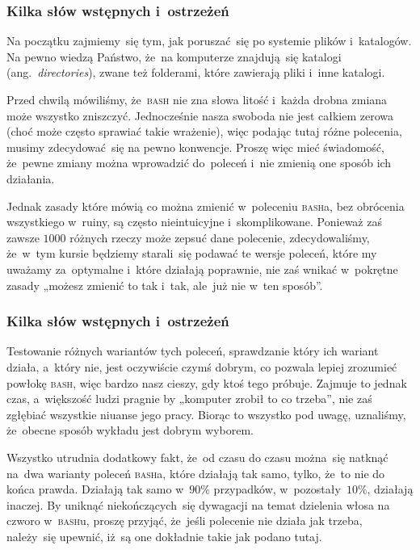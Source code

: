 \documentclass[10pt,t]{beamer}
\begin{document}
\begin{frame}
  \frametitle{Kilka słów wstępnych i~ostrzeżeń}


  Na początku zajmiemy~się tym, jak poruszać~się po systemie plików
  i~katalogów. Na pewno wiedzą Państwo, że~na komputerze znajdują~się
  katalogi (ang.~\textit{directories}), zwane też folderami, które zawierają
  pliki i~inne katalogi.

  Przed chwilą mówiliśmy, że~\textsc{bash} nie zna słowa litość i~każda
  drobna zmiana może wszystko zniszczyć. Jednocześnie nasza swoboda nie jest
  całkiem zerowa (choć może często sprawiać takie wrażenie), więc
  podając tutaj różne polecenia, musimy zdecydować~się na pewno konwencje.
  Proszę więc mieć świadomość, że~\alert{pewne} zmiany można wprowadzić
  do~poleceń i~nie zmienią one sposób ich działania.

  Jednak zasady które mówią co \alert{można} zmienić w~poleceniu
  \textsc{bash}a, bez obrócenia wszystkiego w~ruiny, są często nieintuicyjne
  i~skomplikowane. Ponieważ zaś zawsze $1000$ różnych rzeczy może zepsuć
  dane polecenie, zdecydowaliśmy, że~w~tym kursie będziemy starali~się
  podawać te wersje poleceń, które my uważamy za~optymalne i~które działają
  poprawnie, nie zaś wnikać w~pokrętne zasady „możesz zmienić to tak i~tak,
  ale~już nie w~ten sposób”.

\end{frame}





\begin{frame}
  \frametitle{Kilka słów wstępnych i~ostrzeżeń}


  Testowanie różnych wariantów tych poleceń, sprawdzanie który ich wariant
  działa, a~który nie, jest oczywiście czymś dobrym, co pozwala lepiej
  zrozumieć powłokę \textsc{bash}, więc bardzo nasz cieszy, gdy ktoś tego
  próbuje. Zajmuje to jednak czas, a~większość ludzi pragnie by „komputer
  zrobił to co trzeba”, nie zaś zgłębiać wszystkie niuanse jego pracy.
  Biorąc to wszystko pod uwagę, uznaliśmy, że~obecne sposób wykładu jest
  dobrym wyborem.

  Wszystko utrudnia dodatkowy fakt, że~od czasu do czasu można~się natknąć
  na~dwa warianty poleceń \textsc{bash}a, które działają tak samo, tylko,
  że~to nie do końca prawda. Działają tak samo w~$90\%$ przypadków,
  w~pozostały~$10\%$, działają inaczej. By uniknąć niekończących~się
  dywagacji na temat dzielenia włosa na czworo w~\textsc{bash}u, proszę
  przyjąć, że~jeśli polecenie nie działa jak trzeba, należy~się upewnić,
  iż~są one \alert{dokładnie} takie jak podano tutaj.

\end{frame}
\end{document}
